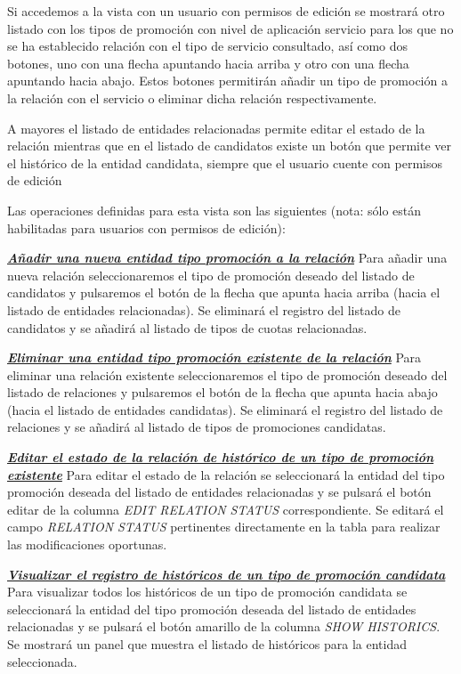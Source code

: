 Si accedemos a la vista con un usuario con permisos de edición se mostrará otro listado con los tipos de promoción con nivel de aplicación servicio para los que no se ha establecido relación con el tipo de servicio consultado, así como dos botones, uno con una flecha apuntando hacia arriba y otro con una flecha apuntando hacia abajo. Estos botones permitirán añadir un tipo de promoción a la relación con el servicio o eliminar dicha relación respectivamente. 

A mayores el listado de entidades relacionadas permite editar el estado de la relación mientras que en el listado de candidatos existe un botón que permite ver el histórico de la entidad candidata, siempre que el usuario cuente con permisos de edición


Las operaciones definidas para esta vista son las siguientes (nota: sólo están habilitadas para usuarios con permisos de edición):

\underline{\textsl{\textbf{Añadir una nueva entidad tipo promoción a la relación}}} \newline
Para añadir una nueva relación seleccionaremos el tipo de promoción deseado del listado de candidatos y pulsaremos el botón de la flecha que apunta hacia arriba (hacia el listado de entidades relacionadas). Se eliminará el registro del listado de candidatos y se añadirá al listado de tipos de cuotas relacionadas.


\underline{\textsl{\textbf{Eliminar una entidad tipo promoción existente de la relación}}}\newline
Para eliminar una relación existente seleccionaremos el tipo de promoción deseado del listado de relaciones y pulsaremos el botón de la flecha que apunta hacia abajo (hacia el listado de entidades candidatas). Se eliminará el registro del listado de relaciones y se añadirá al listado de tipos de promociones candidatas.


\underline{\textsl{\textbf{Editar el estado de la relación de histórico de un tipo de promoción existente}}}
Para editar el estado de la relación se seleccionará la entidad del tipo promoción  deseada del listado de entidades relacionadas y se pulsará el botón editar de la columna \textit{EDIT RELATION STATUS} correspondiente. Se editará el campo \emph{RELATION STATUS}  pertinentes directamente en la tabla para realizar las modificaciones oportunas.

\underline{\textsl{\textbf{Visualizar el registro de históricos de un tipo de promoción candidata}}}
Para visualizar todos los históricos de un tipo de promoción candidata se seleccionará la entidad del tipo promoción deseada del listado de entidades relacionadas y se pulsará el botón amarillo de la columna \textit{SHOW HISTORICS}. Se mostrará un panel que muestra el listado de históricos para la entidad seleccionada. 


